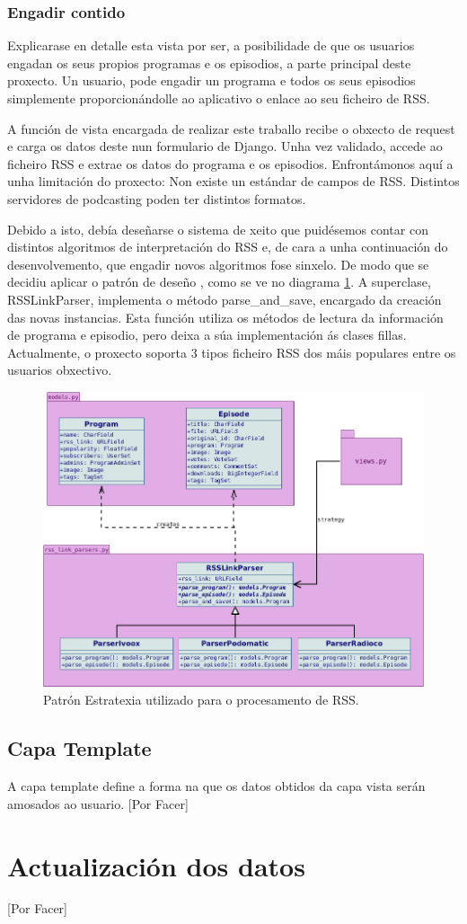 \subsubsection{Engadir contido}
\label{rss_parser_section}

Explicarase en detalle esta vista por ser, a posibilidade de que os usuarios engadan os seus propios programas e os episodios, a parte principal deste proxecto. Un usuario, pode engadir un programa e todos os seus episodios simplemente proporcionándolle ao aplicativo o enlace ao seu ficheiro de RSS.

A función de vista encargada de realizar este traballo recibe o obxecto de request e carga os datos deste nun formulario de Django. Unha vez validado, accede ao ficheiro RSS e extrae os datos do programa e os episodios. Enfrontámonos aquí a unha limitación do proxecto: Non existe un estándar de campos de RSS. Distintos servidores de podcasting poden ter distintos formatos.

Debido a isto, debía deseñarse o sistema de xeito que puidésemos contar con distintos algoritmos de interpretación do RSS e, de cara a unha continuación do desenvolvemento, que engadir novos algoritmos fose sinxelo. De modo que se decidiu aplicar o patrón de deseño , como se ve no diagrama \ref{fig:strategy}. A superclase, RSSLinkParser, implementa o método parse\_and\_save, encargado da creación das novas instancias. Esta función utiliza os métodos de lectura da información de programa e episodio, pero deixa a súa implementación ás clases fillas. Actualmente, o proxecto soporta 3 tipos ficheiro RSS dos máis populares entre os usuarios obxectivo.

\begin{figure}[h]
	\centering
	\includegraphics[scale=0.5,keepaspectratio=true]{./images/strategy.png}
	\caption{Patrón Estratexia utilizado para o procesamento de RSS.}
	\label{fig:strategy}
\end{figure}


\subsection{Capa Template}

A capa template define a forma na que os datos obtidos da capa vista serán amosados ao usuario.  [Por Facer]


\section{Actualización dos datos}

[Por Facer]